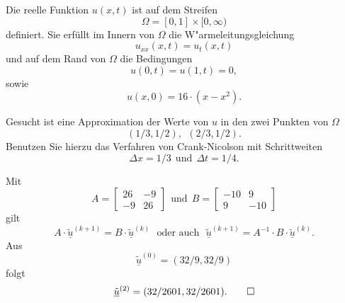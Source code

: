 Die reelle Funktion $u(x,t)$ ist auf dem Streifen
\[
\Omega = [0, 1] \times [0,\infty)
\]
definiert.
Sie erfüllt im Innern von $\Omega$ die W"armeleitungsgleichung
\[
u_{xx}(x,t) = u_{t}(x,t)
\]
und auf dem Rand von $\Omega$ die Bedingungen
\[
u(0,t) = u(1,t) = 0,
\]
sowie
\[
u(x,0) = 16 \cdot (x - x^2).
\]

\vspace{1mm}

Gesucht ist eine Approximation der Werte von $u$ in den zwei Punkten von
$\Omega$
\[
(1/3,1/2), \ \  (2/3,1/2).
\]
Benutzen Sie hierzu das Verfahren von Crank-Nicolson mit Schrittweiten
\[
\Delta x = 1/3 \ \ \text{und} \ \  \Delta t = 1/4.
\]

\begin{loesung}
Mit
\[
A = \left[\begin{array}{rr} 26 & -9 \\ -9 & 26 \end{array}\right]
\ \ \text{und}
\ \ B = \left[\begin{array}{rr} -10 & 9 \\ 9 & -10 \end{array}\right]
\]
gilt
\[
A \cdot \underline{\tilde u}^{(k+1)}
=
B \cdot \underline{\tilde u}^{(k)}
\ \ \ \text{oder auch}
\ \ \ \underline{\tilde u}^{(k+1)} = A^{-1} \cdot B \cdot \underline{\tilde u}^{(k)}.
\]
Aus 
\[
\underline{\tilde u}^{(0)} = (32/9, 32/9)
\]
folgt
\[
\underline{\tilde u}^{(2)} = (32/2601, 32/2601).
\qedhere
\]
\end{loesung}

